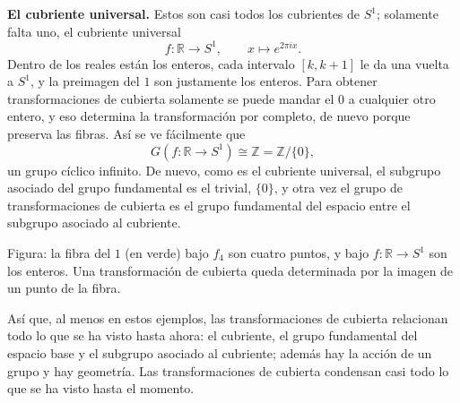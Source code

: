 \documentclass[11pt]{article}
\begin{document}
\medskip\noindent\textbf{El cubriente universal.} Estos son casi todos los cubrientes de $S^1$; solamente falta uno, el cubriente universal
\[
  f\colon\mathbb R\to S^1,\qquad x\longmapsto e^{2\pi ix}.
\]
Dentro de los reales están los enteros, cada intervalo $[k,k+1]$ le da una vuelta a $S^1$, y la preimagen del $1$ son justamente los enteros. Para obtener transformaciones de cubierta solamente se puede mandar el $0$ a cualquier otro entero, y eso determina la transformación por completo, de nuevo porque preserva las fibras. Así se ve fácilmente que
\[
  G(f\colon\mathbb R\to S^1)\cong\mathbb Z=\mathbb Z/\{0\},
\]
un grupo cíclico infinito. De nuevo, como es el cubriente universal, el subgrupo asociado del grupo fundamental es el trivial, $\{0\}$, y otra vez el grupo de transformaciones de cubierta es el grupo fundamental del espacio entre el subgrupo asociado al cubriente.

\begin{center}
\end{center}

\noindent Figura: la fibra del $1$ (en verde) bajo $f_4$ son cuatro puntos, y bajo $f\colon\mathbb R\to S^1$ son los enteros. Una transformación de cubierta queda determinada por la imagen de un punto de la fibra.

Así que, al menos en estos ejemplos, las transformaciones de cubierta relacionan todo lo que se ha visto hasta ahora: el cubriente, el grupo fundamental del espacio base y el subgrupo asociado al cubriente; además hay la acción de un grupo y hay geometría. Las transformaciones de cubierta condensan casi todo lo que se ha visto hasta el momento.
\end{document}
